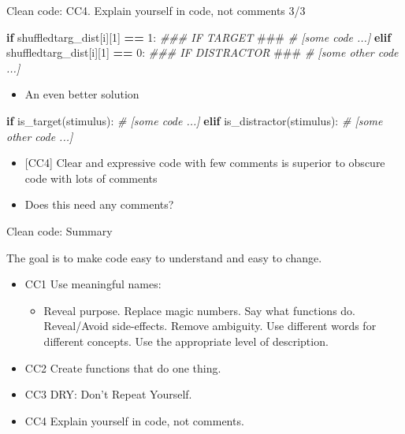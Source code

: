 \documentclass[
  8pt,
  ignorenonframetext,
]{beamer}
\newenvironment{Shaded}{\begin{snugshade}}{\end{snugshade}}
\newcommand{\AlertTok}[1]{\textcolor[rgb]{0.94,0.16,0.16}{#1}}
\newcommand{\CommentTok}[1]{\textcolor[rgb]{0.56,0.35,0.01}{\textit{#1}}}
\newcommand{\ControlFlowTok}[1]{\textcolor[rgb]{0.13,0.29,0.53}{\textbf{#1}}}
\newcommand{\DecValTok}[1]{\textcolor[rgb]{0.00,0.00,0.81}{#1}}
\newcommand{\NormalTok}[1]{#1}
\newcommand{\OperatorTok}[1]{\textcolor[rgb]{0.81,0.36,0.00}{\textbf{#1}}}
\providecommand{\tightlist}{%
  \setlength{\itemsep}{0pt}\setlength{\parskip}{0pt}}
\begin{document}
\begin{frame}[fragile]{Clean code: CC4. Explain yourself in code, not
comments 3/3}
\protect\hypertarget{clean-code-cc4.-explain-yourself-in-code-not-comments-33}{}
\begin{Shaded}
\begin{Highlighting}[]
\ControlFlowTok{if}\NormalTok{ shuffledtarg\_dist[i][}\DecValTok{1}\NormalTok{] }\OperatorTok{==} \DecValTok{1}\NormalTok{: }\CommentTok{\#\#\# IF TARGET }\AlertTok{\#\#\#}
    \CommentTok{\# [some code ...]}
\ControlFlowTok{elif}\NormalTok{ shuffledtarg\_dist[i][}\DecValTok{1}\NormalTok{] }\OperatorTok{==} \DecValTok{0}\NormalTok{: }\CommentTok{\#\#\# IF DISTRACTOR }\AlertTok{\#\#\#}
    \CommentTok{\# [some other code ...]}
\end{Highlighting}
\end{Shaded}

\begin{itemize}
\tightlist
\item
  An even better solution
\end{itemize}

\begin{Shaded}
\begin{Highlighting}[]
\ControlFlowTok{if}\NormalTok{ is\_target(stimulus):}
    \CommentTok{\# [some code ...]}
\ControlFlowTok{elif}\NormalTok{ is\_distractor(stimulus):}
    \CommentTok{\# [some other code ...]}
\end{Highlighting}
\end{Shaded}

\begin{itemize}
\item
  {[}CC4{]} Clear and expressive code with few comments is superior to
  obscure code with lots of comments
\item
  Does this need any comments?
\end{itemize}
\end{frame}

\begin{frame}{Clean code: Summary}
\protect\hypertarget{clean-code-summary}{}
\begin{block}{The goal is to make code easy to understand and easy to
change.}
\protect\hypertarget{the-goal-is-to-make-code-easy-to-understand-and-easy-to-change.}{}
\begin{itemize}
\item
  CC1 Use meaningful names:

  \begin{itemize}
  \tightlist
  \item
    Reveal purpose. Replace magic numbers. Say what functions do.
    Reveal/Avoid side-effects. Remove ambiguity. Use different words for
    different concepts. Use the appropriate level of description.
  \end{itemize}
\item
  CC2 Create functions that do one thing.
\item
  CC3 DRY: Don't Repeat Yourself.
\item
  CC4 Explain yourself in code, not comments.
\end{itemize}
\end{block}
\end{frame}
\end{document}
